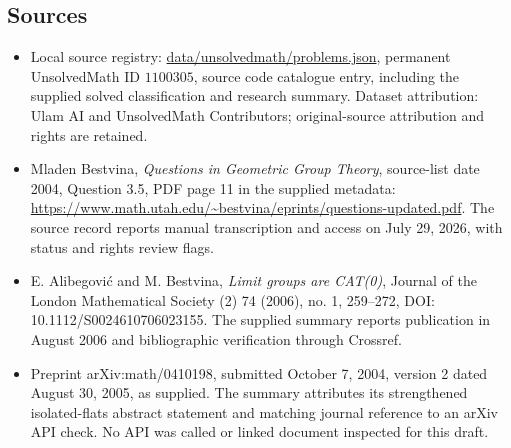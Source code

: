 \documentclass[11pt]{article}
\begin{document}
\subsection{Sources}
\begin{itemize}
\item Local source registry: \url{data/unsolvedmath/problems.json}, permanent UnsolvedMath ID $1100305$, source code catalogue entry, including the supplied solved classification and research summary. Dataset attribution: Ulam AI and UnsolvedMath Contributors; original-source attribution and rights are retained.
\item Mladen Bestvina, \emph{Questions in Geometric Group Theory}, source-list date 2004, Question 3.5, PDF page 11 in the supplied metadata: \url{https://www.math.utah.edu/~bestvina/eprints/questions-updated.pdf}. The source record reports manual transcription and access on July 29, 2026, with status and rights review flags.
\item E. Alibegovi\'c and M. Bestvina, \emph{Limit groups are CAT(0)}, Journal of the London Mathematical Society (2) 74 (2006), no. 1, 259--272, DOI: 10.1112/S0024610706023155. The supplied summary reports publication in August 2006 and bibliographic verification through Crossref.
\item Preprint arXiv:math/0410198, submitted October 7, 2004, version 2 dated August 30, 2005, as supplied. The summary attributes its strengthened isolated-flats abstract statement and matching journal reference to an arXiv API check. No API was called or linked document inspected for this draft.
\end{itemize}
\end{document}
